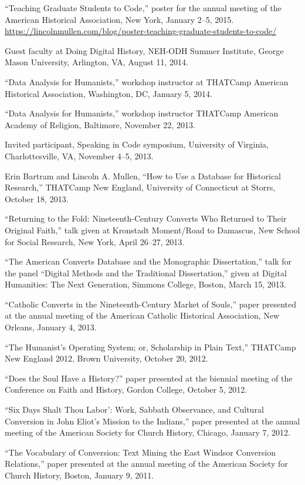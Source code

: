 \documentclass[11pt]{article}
\begin{document}
``Teaching Graduate Students to Code,'' poster for the annual meeting of the
American Historical Association, New York, January 2--5, 2015.
\url{https://lincolnmullen.com/blog/poster-teaching-graduate-students-to-code/}

Guest faculty at Doing Digital History, NEH-ODH 
Summer Institute, George Mason University, Arlington, VA, August 11, 2014.

``Data Analysis for Humanists,'' workshop instructor at THATCamp American Historical Association, 
Washington, DC, January 5, 2014.

``Data Analysis for Humanists,'' workshop instructor THATCamp American Academy of Religion, Baltimore, November 22, 2013.

Invited participant, Speaking in Code symposium, University of Virginia, 
Charlottesville, VA, November 4--5, 2013.

Erin Bartram and Lincoln A. Mullen, ``How to Use a Database for Historical 
Research,'' THATCamp New England, University of Connecticut at Storrs, October 
18, 2013.

``Returning to the Fold: Nineteenth-Century Converts Who Returned to
Their Original Faith,'' talk given at Kronstadt Moment/Road to Damascus,
New School for Social Research, New York, April 26--27, 2013.

``The American Converts Database and the Monographic Dissertation,''
talk for the panel ``Digital Methods and the Traditional Dissertation,''
given at Digital Humanities: The Next Generation, Simmons College,
Boston, March 15, 2013.

``Catholic Converts in the Nineteenth-Century Market of Souls,'' paper
presented at the annual meeting of the American Catholic Historical
Association, New Orleans, January 4, 2013.

``The Humanist's Operating System; or, Scholarship in Plain Text,'' THATCamp 
New England 2012, Brown University, October 20, 2012.

``Does the Soul Have a History?'' paper presented at the biennial
meeting of the Conference on Faith and History, Gordon College, October
5, 2012.

``Six Days Shalt Thou Labor': Work, Sabbath Observance, and Cultural
Conversion in John Eliot's Mission to the Indians,'' paper presented at
the annual meeting of the American Society for Church History, Chicago,
January 7, 2012.

``The Vocabulary of Conversion: Text Mining the East Windsor Conversion
Relations,'' paper presented at the annual meeting of the American
Society for Church History, Boston, January 9, 2011.
\end{document}
